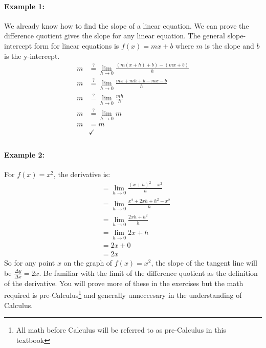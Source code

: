 \documentclass[../revisedmain.tex]{subfiles}
\begin{document}
	\paragraph{Example 1:} We already know how to find the slope of a linear equation. We can prove the difference quotient gives the slope for any linear equation. The general slope-intercept form for linear equations is \(f(x)=mx+b\) where \(m\) is the slope and \(b\) is the y-intercept. 
	\begin{equation}
		\begin{split}
		m&\stackrel{?}{=} \lim_{h\to 0}\frac{(m(x+h)+b)-(mx+b)}{h}\\
		m&\stackrel{?}{=} \lim_{h\to 0}\frac{mx+mh+b-mx-b}{h}\\
		m&\stackrel{?}{=} \lim_{h\to 0}\frac{mh}{h}\\
		m&\stackrel{?}{=} \lim_{h\to 0}m\\
		m&=m\\
		&\checkmark\\
	\end{split}
	\end{equation}
	\paragraph{Example 2:} For $f(x)=x^2$, the derivative is:
	\begin{equation}
	\begin{split}
	&= \lim_{h\to 0} \frac{(x+h)^2-x^2}{h} \\
	&= \lim_{h\to 0} \frac{x^2+2xh+h^2-x^2}{h} \\
	&= \lim_{h\to 0} \frac{2xh+h^2}{h} \\
	&= \lim_{h\to 0} 2x+h \\
	&= 2x+0 \\
	&= 2x
	\end{split}
	\end{equation}
	So for any point $x$ on the graph of $f(x)=x^2$, the slope of the tangent line will be $\frac{\Delta y}{\Delta x}=2x$. Be familiar with the limit of the difference quotient as the definition of the derivative. You will prove more of these in the exercises but the math required is pre-Calculus\footnote{All math before Calculus will be referred to as pre-Calculus in this textbook} and generally unneccesary in the understanding of Calculus.\\
\end{document}

